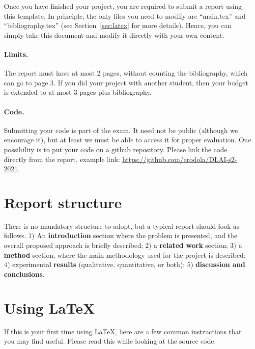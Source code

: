 \documentclass{article}
\begin{document}
Once you have finished your project, you are required to submit a report using this template. In principle, the only files you need to modify are ``main.tex'' and ``bibliography.tex'' (see Section~\ref{sec:latex} for more details). Hence, you can simply take this document and modify it directly with your own content.

\paragraph*{Limits.}
The report must have at most 2 pages, without counting the bibliography, which can go to page 3. If you did your project with another student, then your budget is extended to at most 3 pages plus bibliography.

\paragraph*{Code.} 
Submitting your code is part of the exam. It need not be public (although we encourage it), but at least we must be able to access it for proper evaluation. One possibility is to put your code on a github repository. Please link the code directly from the report, example link: \url{https://github.com/erodola/DLAI-s2-2021}.

\section*{Report structure}

There is no mandatory structure to adopt, but a typical report should look as follows. 1) An \textbf{introduction} section where the problem is presented, and the overall proposed approach is briefly described; 2) a \textbf{related work} section; 3) a \textbf{method} section, where the main methodology used for the project is described; 4) experimental \textbf{results} (qualitative, quantitative, or both); 5) \textbf{discussion and conclusions}.

\section*{Using \LaTeX}\label{sec:latex}

If this is your first time using \LaTeX, here are a few common instructions that you may find useful. Please read this while looking at the source code.
\end{document}
